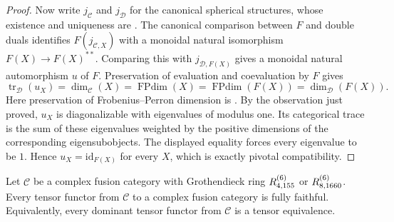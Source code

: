 \begin{proof}
Now write $j_{\mathcal C}$ and $j_{\mathcal D}$ for the canonical
spherical structures, whose existence and uniqueness are
\cite[Proposition~9.5.1]{EGNO}. The canonical comparison between $F$ and
double duals identifies $F(j_{\mathcal C,X})$ with a monoidal natural
isomorphism $F(X)\to F(X)^{**}$. Comparing this with
$j_{\mathcal D,F(X)}$ gives a monoidal natural automorphism
$u$ of $F$. Preservation of evaluation and coevaluation by $F$ gives
\[
 \operatorname{tr}_{\mathcal D}(u_X)
 =\dim_{\mathcal C}(X)
 =\operatorname{FPdim}(X)
 =\operatorname{FPdim}(F(X))
 =\dim_{\mathcal D}(F(X)).
\]
Here preservation of Frobenius--Perron dimension is
\cite[Proposition~4.5.7]{EGNO}. By the observation just proved, $u_X$ is
diagonalizable with eigenvalues of modulus one. Its categorical trace
is the sum of these eigenvalues weighted by the positive dimensions
of the corresponding eigensubobjects. The displayed equality forces
every eigenvalue to be $1$. Hence $u_X=\mathrm{id}_{F(X)}$ for every
$X$, which is exactly pivotal compatibility.
\end{proof}

\begin{theorem}
\label{thm:frontier-all-tensor-functors}
Let $\mathcal C$ be a complex fusion category with Grothendieck ring
$R^{(6)}_{4,155}$ or $R^{(6)}_{8,1660}$. Every tensor functor from
$\mathcal C$ to a complex fusion category is fully faithful.
Equivalently, every dominant tensor functor from $\mathcal C$ is a
tensor equivalence.
\end{theorem}

